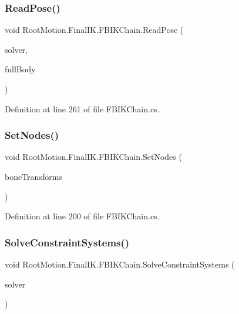 \subsubsection{\texorpdfstring{Read\+Pose()}{ReadPose()}}
{\footnotesize\ttfamily void Root\+Motion.\+Final\+I\+K.\+F\+B\+I\+K\+Chain.\+Read\+Pose (\begin{DoxyParamCaption}\item[{\mbox{\hyperlink{class_root_motion_1_1_final_i_k_1_1_i_k_solver_full_body}{I\+K\+Solver\+Full\+Body}}}]{solver,  }\item[{bool}]{full\+Body }\end{DoxyParamCaption})}



Definition at line 261 of file F\+B\+I\+K\+Chain.\+cs.

\mbox{\label{class_root_motion_1_1_final_i_k_1_1_f_b_i_k_chain_aad75789bdd403e5482af023ec0cc47d7}} 
\subsubsection{\texorpdfstring{Set\+Nodes()}{SetNodes()}}
{\footnotesize\ttfamily void Root\+Motion.\+Final\+I\+K.\+F\+B\+I\+K\+Chain.\+Set\+Nodes (\begin{DoxyParamCaption}\item[{params Transform \mbox{[}$\,$\mbox{]}}]{bone\+Transforms }\end{DoxyParamCaption})}



Definition at line 200 of file F\+B\+I\+K\+Chain.\+cs.

\mbox{\label{class_root_motion_1_1_final_i_k_1_1_f_b_i_k_chain_ad6df73725445c8cb869119224261b336}} 
\subsubsection{\texorpdfstring{Solve\+Constraint\+Systems()}{SolveConstraintSystems()}}
{\footnotesize\ttfamily void Root\+Motion.\+Final\+I\+K.\+F\+B\+I\+K\+Chain.\+Solve\+Constraint\+Systems (\begin{DoxyParamCaption}\item[{\mbox{\hyperlink{class_root_motion_1_1_final_i_k_1_1_i_k_solver_full_body}{I\+K\+Solver\+Full\+Body}}}]{solver }\end{DoxyParamCaption})}



